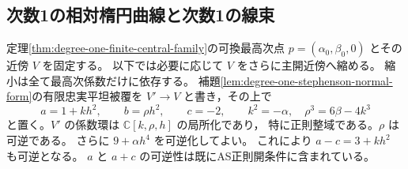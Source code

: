 \subsection{次数1の相対楕円曲線と次数1の線束}
\label{subsec:degree-one-relative-curve}

定理\ref{thm:degree-one-finite-central-family}の可換最高次点
$p=(\alpha_0,\beta_0,0)$ とその近傍 $V$ を固定する。
以下では必要に応じて $V$ をさらに主開近傍へ縮める。
縮小は全て最高次係数だけに依存する。
補題\ref{lem:degree-one-stephenson-normal-form}の有限忠実平坦被覆を
$V'\to V$ と書き，その上で
\[
 a=1+kh^2,\qquad b=\rho h^2,\qquad c=-2,
 \qquad k^2=-\alpha,\quad \rho^3=6\beta-4k^3
\]
と置く。$V'$ の係数環は $\mathbb C[k,\rho,h]$ の局所化であり，
特に正則整域である。$\rho$ は可逆である。
さらに $9+\alpha h^4$ を可逆化してよい。
これにより $a-c=3+kh^2$ も可逆となる。
$a$ と $a+c$ の可逆性は既にAS正則開条件に含まれている。

